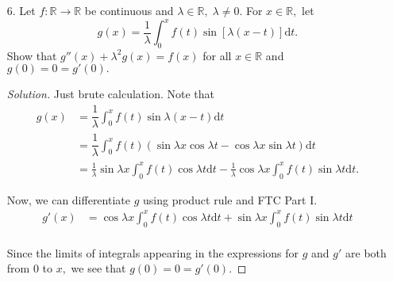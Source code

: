 \documentclass[12pt]{article}
\theoremstyle{definition}
\newenvironment{soln}{\begin{proof}[Solution]}{\end{proof}}
\begin{document}
\begin{itemize}
\begin{soln}
		Both the parts are now solved easily.
		\begin{itemize}
			\item[(i)] We have $g(t) = \cos(t^2)$ and $v(x) = 2x.$ Thus, $v'(x) = 2$ and 
			\begin{equation*} 
				\boxed{F'(x) = 2\cos(4x^2).}
			\end{equation*}
			\item[(ii)] We have $g(t) = \cos(t)$ and $v(x) = x^2.$ Thus, $v'(x) = 2x$ and 
			\begin{equation*} 
				\boxed{F'(x) = 2x\cos(x^2).} \qedhere
			\end{equation*}
		\end{itemize}
	\end{soln}
	\newpage
	\item[6.] Let $f:\mathbb{R} \to \mathbb{R}$ be continuous and $\lambda \in \mathbb{R},\; \lambda \neq 0.$ For $x \in \mathbb{R},$ let
	\begin{equation*} 
		g(x) = \dfrac{1}{\lambda}\int_{0}^{x} f(t)\sin\left[\lambda(x - t)\right] {\mathrm{d}}t.
	\end{equation*}
	Show that $g''(x) + \lambda^2g(x) = f(x)$ for all $x \in \mathbb{R}$ and $g(0) = 0 = g'(0).$

	\begin{soln}
		Just brute calculation. Note that
		\begin{align*}
			g(x) &= \dfrac{1}{\lambda}\int_{0}^{x} f(t)\sin \lambda(x - t) {\mathrm{d}}t\\
			&= \dfrac{1}{\lambda}\int_{0}^{x} f(t) \left(\sin \lambda x\cos \lambda t - \cos \lambda x \sin \lambda t\right) {\mathrm{d}}t\\
			&= \frac{1}{\lambda}\sin\lambda x\int_{0}^{x} f(t)\cos \lambda t {\mathrm{d}}t - \frac{1}{\lambda}\cos \lambda x \int_{0}^{x} f(t)\sin \lambda t {\mathrm{d}}t.
		\end{align*}

		Now, we can differentiate $g$ using product rule and FTC Part I.
		\begin{align*}
			g'(x) &= \cos\lambda x\int_{0}^{x} f(t)\cos \lambda t {\mathrm{d}}t + \sin \lambda x \int_{0}^{x} f(t)\sin \lambda t {\mathrm{d}}t \\
		\end{align*}

		Since the limits of integrals appearing in the expressions for $g$ and $g'$ are both from $0$ to $x,$ we see that $g(0) = 0 = g'(0).$


\end{soln}
\end{itemize}
\end{document}

